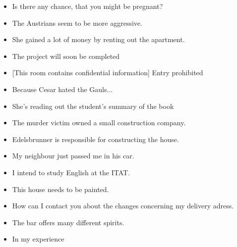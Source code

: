 \documentclass{article}
\title{}
\author{Andreas Hofer}
\begin{document}
	\begin{itemize}
		\item{Is there any chance, that you might be pregnant?}
		\item{The Austrians seem to be more aggressive.}
		\item{She gained a lot of money by renting out the apartment.}
		\item{The project will soon be completed}
		\item{[This room contains confidential information] Entry prohibited}
		\item{Because Cesar hated the Gauls...}
		\item{She's reading out the student's summary of the book}
		\item{The murder victim owned a small construction company.}
		\item{Edelsbrunner is responsible for constructing the house.}
		\item{My neighbour just passed me in his car.}
		\item{I intend to study English at the ITAT.}
		\item{This house needs to be painted.}
		\item{How can I contact you about the changes concerning my delivery adress.}
		\item{The bar offers many different spirits.}
		\item{In my experience}
	\end{itemize}
	
\end{document}
